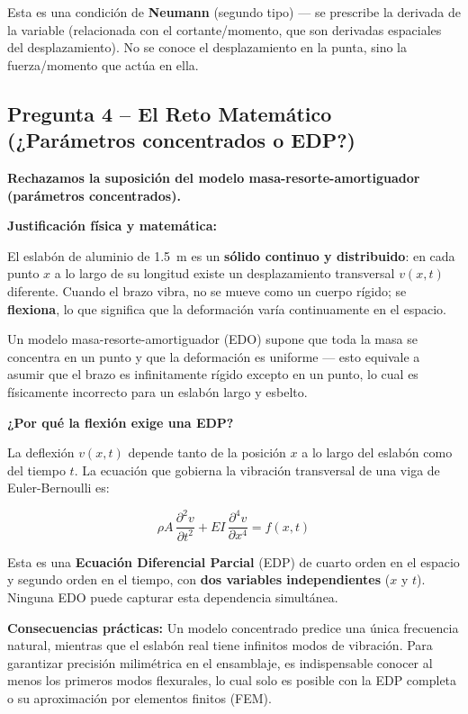 \documentclass[12pt,a4paper]{article}
\begin{document}
Esta es una condición de \textbf{Neumann} (segundo tipo) --- se prescribe la derivada de la
variable (relacionada con el cortante/momento, que son derivadas espaciales del desplazamiento).
No se conoce el desplazamiento en la punta, sino la fuerza/momento que actúa en ella.

\subsection*{Pregunta 4 -- El Reto Matemático (¿Parámetros concentrados o EDP?)}

\noindent\textbf{Rechazamos la suposición del modelo masa-resorte-amortiguador (parámetros
concentrados).}

\noindent\textbf{Justificación física y matemática:}

El eslabón de aluminio de 1.5~m es un \textbf{sólido continuo y distribuido}: en cada punto $x$
a lo largo de su longitud existe un desplazamiento transversal $v(x,t)$ diferente. Cuando el
brazo vibra, no se mueve como un cuerpo rígido; se \textbf{flexiona}, lo que significa que la
deformación varía continuamente en el espacio.

Un modelo masa-resorte-amortiguador (EDO) supone que toda la masa se concentra en un punto y
que la deformación es uniforme --- esto equivale a asumir que el brazo es infinitamente rígido
excepto en un punto, lo cual es físicamente incorrecto para un eslabón largo y esbelto.

\noindent\textbf{¿Por qué la flexión exige una EDP?}

La deflexión $v(x,t)$ depende tanto de la posición $x$ a lo largo del eslabón como del tiempo
$t$. La ecuación que gobierna la vibración transversal de una viga de Euler-Bernoulli es:

\begin{equation}
    \rho A\,\frac{\partial^2 v}{\partial t^2} + EI\,\frac{\partial^4 v}{\partial x^4} = f(x,t)
\end{equation}

\noindent Esta es una \textbf{Ecuación Diferencial Parcial} (EDP) de cuarto orden en el espacio
y segundo orden en el tiempo, con \textbf{dos variables independientes} ($x$ y $t$). Ninguna EDO
puede capturar esta dependencia simultánea.

\noindent\textbf{Consecuencias prácticas:} Un modelo concentrado predice una única frecuencia
natural, mientras que el eslabón real tiene infinitos modos de vibración. Para garantizar
precisión milimétrica en el ensamblaje, es indispensable conocer al menos los primeros modos
flexurales, lo cual solo es posible con la EDP completa o su aproximación por elementos finitos
(FEM).
\end{document}
